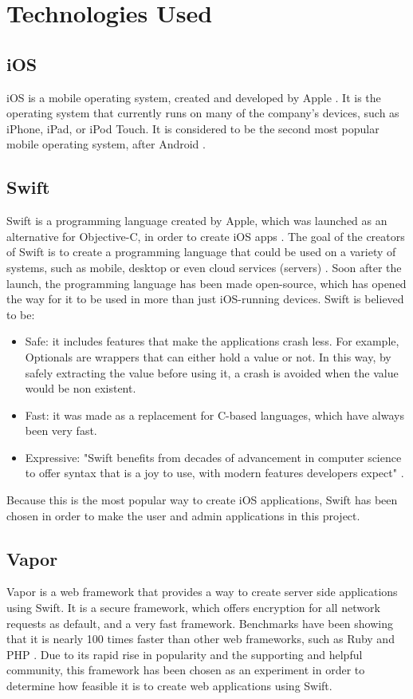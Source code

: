 \section{Technologies Used}
\subsection{iOS}
iOS is a mobile operating system, created and developed by Apple \cite{iOS}. It is the operating system that currently runs on many of the company's devices, such as iPhone, iPad, or iPod Touch. It is considered to be the second most popular mobile operating system, after Android \cite{iOS}.

\subsection{Swift}
Swift is a programming language created by Apple, which was launched as an alternative for Objective-C, in order to create iOS apps \cite{swift}. The goal of the creators of Swift is to create a programming language that could be used on a variety of systems, such as mobile, desktop or even cloud services (servers) \cite{swift}. Soon after the launch, the programming language has been made open-source, which has opened the way for it to be used in more than just iOS-running devices. Swift is believed to be:
\begin{itemize}
    \item Safe: it includes features that make the applications crash less. For example, Optionals are wrappers that can either hold a value or not. In this way, by safely extracting the value before using it, a crash is avoided when the value would be non existent. 
    \item Fast: it was made as a replacement for C-based languages, which have always been very fast.
    \item Expressive: "Swift benefits from decades of advancement in computer science to offer syntax that is a joy to use, with modern features developers expect" \cite{swift}.
\end{itemize}

Because this is the most popular way to create iOS applications, Swift has been chosen in order to make the user and admin applications in this project.

\subsection{Vapor}
Vapor is a web framework that provides a way to create server side applications using Swift. It is a secure framework, which offers encryption for all network requests as default, and a very fast framework. Benchmarks have been showing that it is nearly 100 times faster than other web frameworks, such as Ruby and PHP \cite{vapor}. Due to its rapid rise in popularity and the supporting and helpful community, this framework has been chosen as an experiment in order to determine how feasible it is to create web applications using Swift.

